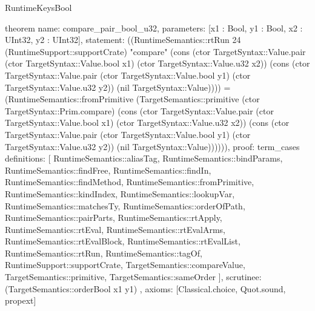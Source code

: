 \begin{lexlean}{RuntimeKeysBool}
\begin{semanticmodule}
theorem{
  name: compare_pair_bool_u32,
  parameters: [x1 : Bool, y1 : Bool, x2 : UInt32, y2 : UInt32],
  statement: ((RuntimeSemantics::rtRun 24 (RuntimeSupport::supportCrate) "compare" (cons (ctor TargetSyntax::Value.pair (ctor TargetSyntax::Value.bool x1) (ctor TargetSyntax::Value.u32 x2)) (cons (ctor TargetSyntax::Value.pair (ctor TargetSyntax::Value.bool y1) (ctor TargetSyntax::Value.u32 y2)) (nil TargetSyntax::Value)))) = (RuntimeSemantics::fromPrimitive (TargetSemantics::primitive (ctor TargetSyntax::Prim.compare) (cons (ctor TargetSyntax::Value.pair (ctor TargetSyntax::Value.bool x1) (ctor TargetSyntax::Value.u32 x2)) (cons (ctor TargetSyntax::Value.pair (ctor TargetSyntax::Value.bool y1) (ctor TargetSyntax::Value.u32 y2)) (nil TargetSyntax::Value)))))),
  proof: term_cases{
    definitions: [
      RuntimeSemantics::aliasTag,
      RuntimeSemantics::bindParams,
      RuntimeSemantics::findFree,
      RuntimeSemantics::findIn,
      RuntimeSemantics::findMethod,
      RuntimeSemantics::fromPrimitive,
      RuntimeSemantics::kindIndex,
      RuntimeSemantics::lookupVar,
      RuntimeSemantics::matchesTy,
      RuntimeSemantics::orderOfPath,
      RuntimeSemantics::pairParts,
      RuntimeSemantics::rtApply,
      RuntimeSemantics::rtEval,
      RuntimeSemantics::rtEvalArms,
      RuntimeSemantics::rtEvalBlock,
      RuntimeSemantics::rtEvalList,
      RuntimeSemantics::rtRun,
      RuntimeSemantics::tagOf,
      RuntimeSupport::supportCrate,
      TargetSemantics::compareValue,
      TargetSemantics::primitive,
      TargetSemantics::sameOrder
    ],
    scrutinee: (TargetSemantics::orderBool x1 y1)
  },
  axioms: [Classical.choice, Quot.sound, propext]
}


\end{semanticmodule}
\end{lexlean}
